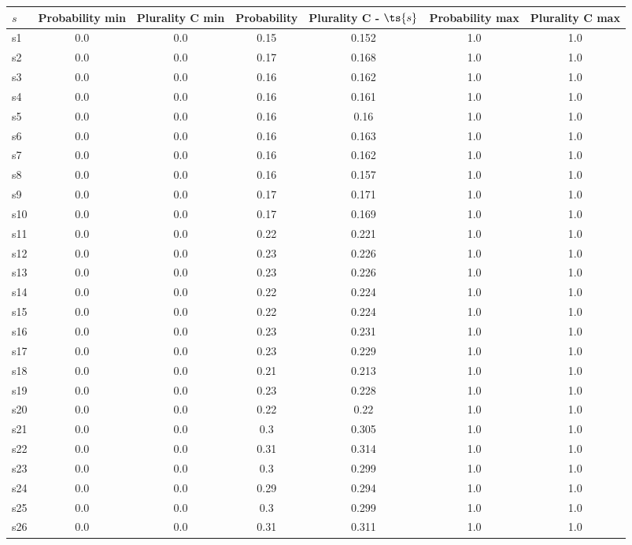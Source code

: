 \documentclass{article}
\begin{document}
\noindent\begin{tabular}{|l|c|c|c|c|c|c|}
\hline
$s$& Probability min & Plurality C min & Probability & Plurality C - $\ts{s}$ & Probability max & Plurality C max\\
\hline
s1 &0.0 & 0.0 & 0.15 & 0.152 & 1.0 & 1.0\\
\hline
s2 &0.0 & 0.0 & 0.17 & 0.168 & 1.0 & 1.0\\
\hline
s3 &0.0 & 0.0 & 0.16 & 0.162 & 1.0 & 1.0\\
\hline
s4 &0.0 & 0.0 & 0.16 & 0.161 & 1.0 & 1.0\\
\hline
s5 &0.0 & 0.0 & 0.16 & 0.16 & 1.0 & 1.0\\
\hline
s6 &0.0 & 0.0 & 0.16 & 0.163 & 1.0 & 1.0\\
\hline
s7 &0.0 & 0.0 & 0.16 & 0.162 & 1.0 & 1.0\\
\hline
s8 &0.0 & 0.0 & 0.16 & 0.157 & 1.0 & 1.0\\
\hline
s9 &0.0 & 0.0 & 0.17 & 0.171 & 1.0 & 1.0\\
\hline
s10 &0.0 & 0.0 & 0.17 & 0.169 & 1.0 & 1.0\\
\hline
s11 &0.0 & 0.0 & 0.22 & 0.221 & 1.0 & 1.0\\
\hline
s12 &0.0 & 0.0 & 0.23 & 0.226 & 1.0 & 1.0\\
\hline
s13 &0.0 & 0.0 & 0.23 & 0.226 & 1.0 & 1.0\\
\hline
s14 &0.0 & 0.0 & 0.22 & 0.224 & 1.0 & 1.0\\
\hline
s15 &0.0 & 0.0 & 0.22 & 0.224 & 1.0 & 1.0\\
\hline
s16 &0.0 & 0.0 & 0.23 & 0.231 & 1.0 & 1.0\\
\hline
s17 &0.0 & 0.0 & 0.23 & 0.229 & 1.0 & 1.0\\
\hline
s18 &0.0 & 0.0 & 0.21 & 0.213 & 1.0 & 1.0\\
\hline
s19 &0.0 & 0.0 & 0.23 & 0.228 & 1.0 & 1.0\\
\hline
s20 &0.0 & 0.0 & 0.22 & 0.22 & 1.0 & 1.0\\
\hline
s21 &0.0 & 0.0 & 0.3 & 0.305 & 1.0 & 1.0\\
\hline
s22 &0.0 & 0.0 & 0.31 & 0.314 & 1.0 & 1.0\\
\hline
s23 &0.0 & 0.0 & 0.3 & 0.299 & 1.0 & 1.0\\
\hline
s24 &0.0 & 0.0 & 0.29 & 0.294 & 1.0 & 1.0\\
\hline
s25 &0.0 & 0.0 & 0.3 & 0.299 & 1.0 & 1.0\\
\hline
s26 &0.0 & 0.0 & 0.31 & 0.311 & 1.0 & 1.0\\
\hline

\end{tabular}
\end{document}
